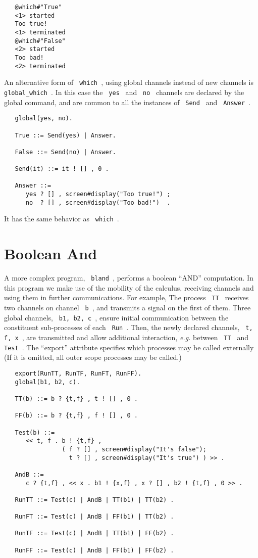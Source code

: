 \begin{verbatim}
   @which#"True"
   <1> started
   Too true!
   <1> terminated
   @which#"False"
   <2> started
   Too bad!
   <2> terminated
\end{verbatim}

\noindent
An alternative form of \verb+ which +, using global channels instead
of new channels is \verb+ global_which +. In this case the
\verb+ yes + and \verb+ no + channels are declared by the global
command, and are common to all the instances of \verb+ Send +
and \verb+ Answer +.

\begin{verbatim}
   global(yes, no).

   True ::= Send(yes) | Answer.

   False ::= Send(no) | Answer.

   Send(it) ::= it ! [] , 0 .

   Answer ::=
      yes ? [] , screen#display("Too true!") ;
      no  ? [] , screen#display("Too bad!")  .
\end{verbatim}

\noindent
It has the same behavior as \verb+ which +.

\section{Boolean And}
\label{bland}

A more complex program, \verb+ bland +, performs a boolean ``AND'' 
computation.  In this program we make use of the mobility of the
calculus, receiving channels and using them in further
communications. For example, The process \verb+ TT + receives two
channels on channel \verb+ b +, and transmits a signal on the first
of them. Three global channels, \verb+ b1, b2, c +, ensure initial
communication between the constituent sub-processes of each 
\verb+ Run +. Then, the  newly declared channels, \verb+ t, f, x +,
are transmitted and allow additional interaction, {\em e.g.} between
\verb+ TT + and \verb+ Test +.  The ``export'' attribute specifies
which processes may be called externally (If it is omitted, all
outer scope processes may be called.)

\begin{verbatim}
   export(RunTT, RunTF, RunFT, RunFF).
   global(b1, b2, c).

   TT(b) ::= b ? {t,f} , t ! [] , 0 .

   FF(b) ::= b ? {t,f} , f ! [] , 0 .

   Test(b) ::=
      << t, f . b ! {t,f} , 
                ( f ? [] , screen#display("It's false");
                  t ? [] , screen#display("It's true") ) >> .

   AndB ::=
      c ? {t,f} , << x . b1 ! {x,f} , x ? [] , b2 ! {t,f} , 0 >> .

   RunTT ::= Test(c) | AndB | TT(b1) | TT(b2) .

   RunFT ::= Test(c) | AndB | FF(b1) | TT(b2) .

   RunTF ::= Test(c) | AndB | TT(b1) | FF(b2) .

   RunFF ::= Test(c) | AndB | FF(b1) | FF(b2) .
\end{verbatim}

